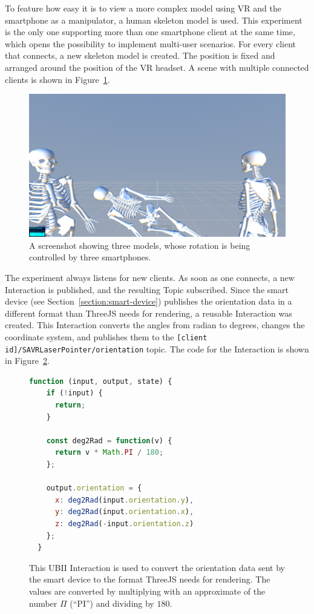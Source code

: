 To feature how easy it is to view a more complex model using \gls{VR} and the smartphone as a manipulator, a human skeleton model is used. This experiment is the only one supporting more than one smartphone client at the same time, which opens the possibility to implement multi-user scenarios. For every client that connects, a new skeleton model is created. The position is fixed and arranged around the position of the \gls{VR} headset. A scene with multiple connected clients is shown in Figure~\ref{fig:screenshot-exp-mv}.

\begin{figure}[H]
	\centering
	\includegraphics[width=12cm]{figures/implementation/screenshot_exp_mv.png}
	\caption[Screenshot of the model viewer]{A screenshot showing three models, whose rotation is being controlled by three smartphones.}\label{fig:screenshot-exp-mv}
\end{figure}

The experiment always listens for new clients. As soon as one connects, a new Interaction is published, and the resulting Topic subscribed. Since the smart device (see Section~\ref{section:smart-device}) publishes the orientation data in a different format than ThreeJS needs for rendering, a reusable Interaction was created. This Interaction converts the angles from radian to degrees, changes the coordinate system, and publishes them to the \lstinline[breaklines=false]{[client id]/SAVRLaserPointer/orientation} topic. The code for the Interaction is shown in Figure~\ref{fig:ubii-interaction-angles}.

\begin{figure}[H]
	\begin{lstlisting}[language=JavaScript]
  function (input, output, state) {
    if (!input) {
      return;
    }

    const deg2Rad = function(v) {
      return v * Math.PI / 180;
    };

    output.orientation = {
      x: deg2Rad(input.orientation.y),
      y: deg2Rad(input.orientation.x),
      z: deg2Rad(-input.orientation.z)
    };
  }
 \end{lstlisting}
	\caption[A UBII Interaction of model viewer]{This \gls{UBII} Interaction is used to convert the orientation data sent by the smart device to the format ThreeJS needs for rendering. The values are converted by multiplying with an approximate of the number $\Pi$ (\enquote{PI}) and dividing by $180$.}\label{fig:ubii-interaction-angles} %
\end{figure}

